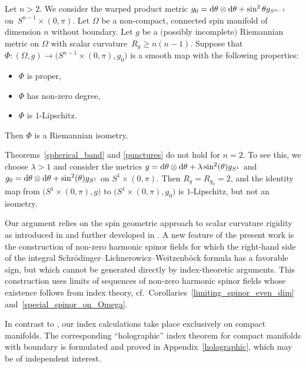 \documentclass[pdftex]{sigma}
\numberwithin{equation}{section}
\begin{document}
\begin{theorem}
\label{punctures}
Let $n>2$.
We consider the warped product metric $g_0 = {\rm d}\theta \otimes {\rm d}\theta + \sin^2 \theta g_{S^{n-1}}$ on~$S^{n-1} \times (0,\pi)$.
Let $\Omega$ be a non-compact, connected spin manifold of dimension $n$ without boundary.
Let $g$ be a $($possibly incomplete$)$ Riemannian metric on $\Omega$ with scalar curvature~${R_g \geq n(n-1)}$.
Suppose that $\Phi\colon (\Omega,g) \to \big(S^{n-1} \times (0,\pi),g_0\big)$ is a smooth map with the following properties:
\begin{itemize}\itemsep=0pt
\item $\Phi$ is proper,
\item $\Phi$ has non-zero degree,
\item $\Phi$ is $1$-Lipschitz.
\end{itemize}
Then $\Phi$ is a Riemannian isometry.
\end{theorem}

\begin{Remark}
Theorems~\ref{spherical_band} and \ref{punctures} do not hold for $n=2$.
To see this, we choose $\lambda > 1$ and consider the metrics $g = {\rm d}\theta \otimes {\rm d}\theta + \lambda \sin^2 (\theta) g_{S^1}$ and $g_0 = {\rm d}\theta \otimes {\rm d}\theta + \sin^2 (\theta) g_{S^1}$ on $S^1 \times (0,\pi)$. Then $R_g=R_{g_0}=2$, and the identity map from $\big(S^1 \times (0,\pi),g\big)$ to $\big(S^1 \times (0,\pi),g_0\big)$ is $1$-Lipschitz, but not an isometry.
\end{Remark}

Our argument relies on the spin geometric approach to scalar curvature rigidity as introduced in \cite{Llarull} and further developed in \cite{Cecchini-Zeidler}.
A new feature of the present work is the construction of non-zero harmonic spinor fields for which the right-hand side of the integral Schr\"odinger--Lichnerowicz--Weitzenb\"ock formula has a favorable sign, but which cannot be generated directly by index-theoretic arguments.
This construction uses limits of sequences of non-zero harmonic spinor fields whose existence follows from index theory, cf.\ Corollaries~\ref{limiting_spinor_even_dim} and~\ref{special_spinor_on_Omega}.

In contrast to \cite{Cecchini-Zeidler}, our index calculations take place exclusively on compact manifolds.
The corresponding ``holographic'' index theorem for compact manifolds with boundary is formulated and proved in Appendix~\ref{holographic}, which may be of independent interest.
\end{document}
